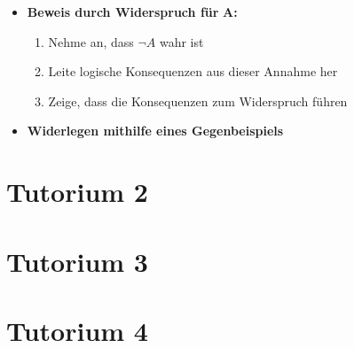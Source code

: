 \documentclass[ieeetran]{article}
\begin{document}
\begin{itemize}
\item \textbf{Beweis durch Widerspruch für }$\mathbf{A}$\textbf{:}
	\begin{enumerate}
		\item Nehme an, dass $\neg A$ wahr ist
		\item Leite logische Konsequenzen aus dieser Annahme her
		\item Zeige, dass die Konsequenzen zum Widerspruch führen
	\end{enumerate}
\item \textbf{Widerlegen mithilfe eines Gegenbeispiels}
\end{itemize}


\section{Tutorium 2} %
\label{sec:tutorium_2}

\section{Tutorium 3} %
\label{sec:tutorium_3}

\section{Tutorium 4} %
\label{sec:tutorium_4}
\end{document}
